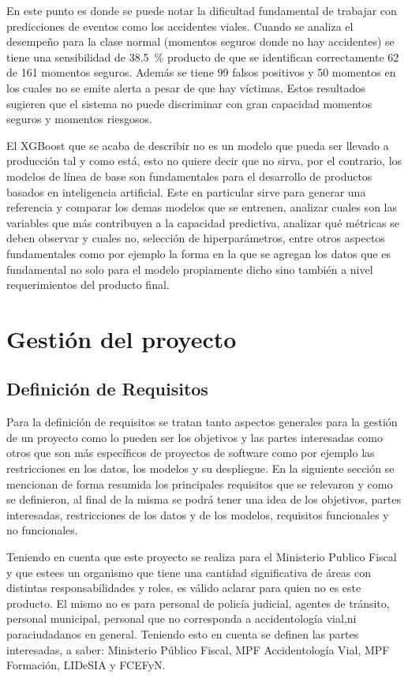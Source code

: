 En este punto es donde se puede notar la dificultad fundamental de trabajar con predicciones de eventos como los accidentes viales. Cuando se analiza el desempeño para la clase normal (momentos seguros donde no hay accidentes) se tiene una sensibilidad de \qty{38.5}{\percent} producto de que se identifican correctamente 62 de 161 momentos seguros. Además se tiene 99 falsos positivos y 50 momentos en los cuales no se emite alerta a pesar de que hay víctimas. Estos resultados sugieren que el sistema no puede discriminar con gran capacidad momentos seguros y momentos riesgosos.

El XGBoost que se acaba de describir no es un modelo que pueda ser llevado a producción tal y como está, esto no quiere decir que no sirva, por el contrario, los modelos de línea de base son fundamentales para el desarrollo de productos basados en inteligencia artificial. Este en particular sirve para generar una referencia y comparar los demas modelos que se entrenen, analizar cuales son las variables que más contribuyen a la capacidad predictiva, analizar qué métricas se deben observar y cuales no, selección de hiperparámetros, entre otros aspectos fundamentales como por ejemplo la forma en la que se agregan los datos que es fundamental no solo para el modelo propiamente dicho sino también a nivel requerimientos del producto final.

\section{Gestión del proyecto}\label{gestiuxf3n-del-proyecto}

\subsection{Definición de Requisitos}\label{definiciuxf3n-de-requisitos}

Para la definición de requisitos se tratan tanto aspectos generales para la gestión de un proyecto como lo pueden ser los objetivos y las partes interesadas como otros que son más específicos de proyectos de software como por ejemplo las restricciones en los datos, los modelos y su despliegue. En la siguiente sección se mencionan de forma resumida los principales requisitos que se relevaron y como se definieron, al final de la misma se podrá tener una idea de los objetivos, partes interesadas, restricciones de los datos y de los modelos, requisitos funcionales y no funcionales.

Teniendo en cuenta que este proyecto se realiza para el Ministerio Publico Fiscal y que estees  un organismo que tiene una cantidad significativa de áreas con distintas responsabilidades y roles, es válido aclarar para quien no es este producto. El mismo no es para personal de policía judicial, agentes de tránsito, personal municipal, personal que no corresponda a accidentología vial,ni paraciudadanos en general. Teniendo esto en cuenta  se definen las partes interesadas, a saber: Ministerio Público Fiscal, MPF Accidentología Vial, MPF Formación, LIDeSIA y FCEFyN.

